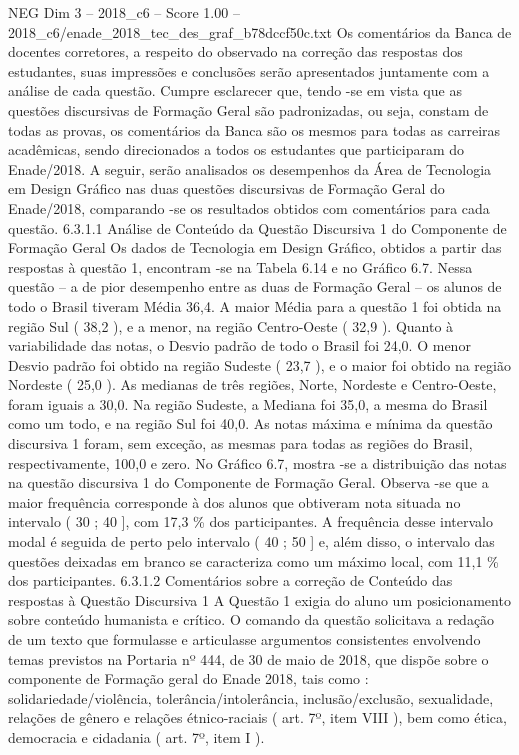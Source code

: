 \begin{textsample}{NEG Dim 3 – 2018\_c6 – Score 1.00 – 2018\_c6/enade\_2018\_tec\_des\_graf\_b78dccf50c.txt}
Os comentários da Banca de docentes corretores, a respeito do observado na correção das respostas dos estudantes, suas impressões e conclusões serão apresentados juntamente com a análise de cada questão.
Cumpre esclarecer que, tendo -se em vista que as questões discursivas de Formação Geral são padronizadas, ou seja, constam de todas as provas, os comentários da Banca são os mesmos para todas as carreiras acadêmicas, sendo direcionados a todos os estudantes que participaram do Enade/2018.
A seguir, serão analisados os desempenhos da Área de Tecnologia em Design Gráfico nas duas questões discursivas de Formação Geral do Enade/2018, comparando -se os resultados obtidos com comentários para cada questão. 6.3.1.1 Análise de Conteúdo da Questão Discursiva 1 do Componente de Formação Geral Os dados de Tecnologia em Design Gráfico, obtidos a partir das respostas à questão 1, encontram -se na Tabela 6.14 e no Gráfico 6.7.
Nessa questão – a de pior desempenho entre as duas de Formação Geral – os alunos de todo o Brasil tiveram Média 36,4.
A maior Média para a questão 1 foi obtida na região Sul ( 38,2 ), e a menor, na região Centro-Oeste ( 32,9 ).
Quanto à variabilidade das notas, o Desvio padrão de todo o Brasil foi 24,0.
O menor Desvio padrão foi obtido na região Sudeste ( 23,7 ), e o maior foi obtido na região Nordeste ( 25,0 ).
As medianas de três regiões, Norte, Nordeste e Centro-Oeste, foram iguais a 30,0.
Na região Sudeste, a Mediana foi 35,0, a mesma do Brasil como um todo, e na região Sul foi 40,0.
As notas máxima e mínima da questão discursiva 1 foram, sem exceção, as mesmas para todas as regiões do Brasil, respectivamente, 100,0 e zero.
No Gráfico 6.7, mostra -se a distribuição das notas na questão discursiva 1 do Componente de Formação Geral.
Observa -se que a maior frequência corresponde à dos alunos que obtiveram nota situada no intervalo ( 30 ; 40 ], com 17,3 \% dos participantes.
A frequência desse intervalo modal é seguida de perto pelo intervalo ( 40 ; 50 ] e, além disso, o intervalo das questões deixadas em branco se caracteriza como um máximo local, com 11,1 \% dos participantes. 6.3.1.2 Comentários sobre a correção de Conteúdo das respostas à Questão Discursiva 1 A Questão 1 exigia do aluno um posicionamento sobre conteúdo humanista e crítico.
O comando da questão solicitava a redação de um texto que formulasse e articulasse argumentos consistentes envolvendo temas previstos na Portaria nº 444, de 30 de maio de 2018, que dispõe sobre o componente de Formação geral do Enade 2018, tais como : solidariedade/violência, tolerância/intolerância, inclusão/exclusão, sexualidade, relações de gênero e relações étnico-raciais ( art. 7º, item VIII ), bem como ética, democracia e cidadania ( art. 7º, item I ).

\end{textsample}
